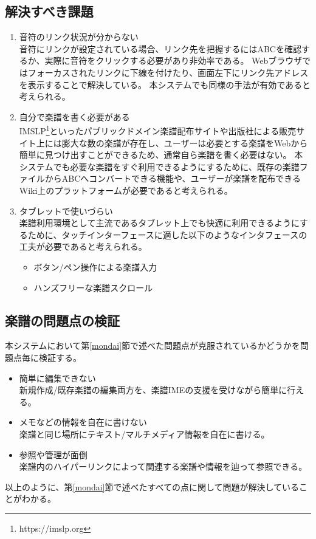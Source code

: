 \subsection{解決すべき課題}
\begin{enumerate}
    \item 音符のリンク状況が分からない\\
    音符にリンクが設定されている場合、リンク先を把握するにはABCを確認するか、実際に音符をクリックする必要があり非効率である。
    Webブラウザではフォーカスされたリンクに下線を付けたり、画面左下にリンク先アドレスを表示することで解決している。
    本システムでも同様の手法が有効であると考えられる。
    \item 自分で楽譜を書く必要がある\\
    IMSLP\footnote{\textsf{https://imslp.org}}といったパブリックドメイン楽譜配布サイトや出版社による販売サイト上には膨大な数の楽譜が存在し、ユーザーは必要とする楽譜をWebから簡単に見つけ出すことができるため、通常自ら楽譜を書く必要はない。
    本システムでも必要な楽譜をすぐ利用できるようにするために、既存の楽譜ファイルからABCへコンバートできる機能や、ユーザーが楽譜を配布できるWiki上のプラットフォームが必要であると考えられる。
    \item タブレットで使いづらい\\
    楽譜利用環境として主流であるタブレット上でも快適に利用できるようにするために、タッチインターフェースに適した以下のようなインタフェースの工夫が必要であると考えられる。
    \begin{itemize}
        \item ボタン/ペン操作による楽譜入力
        \item ハンズフリーな楽譜スクロール
    \end{itemize}
\end{enumerate}

\subsection{楽譜の問題点の検証}
本システムにおいて第\ref{mondai}節で述べた問題点が克服されているかどうかを問題点毎に検証する。
\begin{itemize}
    \item 簡単に編集できない\\
    新規作成/既存楽譜の編集両方を、楽譜IMEの支援を受けながら簡単に行える。
    \item メモなどの情報を自在に書けない\\
    楽譜と同じ場所にテキスト/マルチメディア情報を自在に書ける。
    \item 参照や管理が面倒\\
    楽譜内のハイパーリンクによって関連する楽譜や情報を辿って参照できる。
\end{itemize}
以上のように、第\ref{mondai}節で述べたすべての点に関して問題が解決していることがわかる。